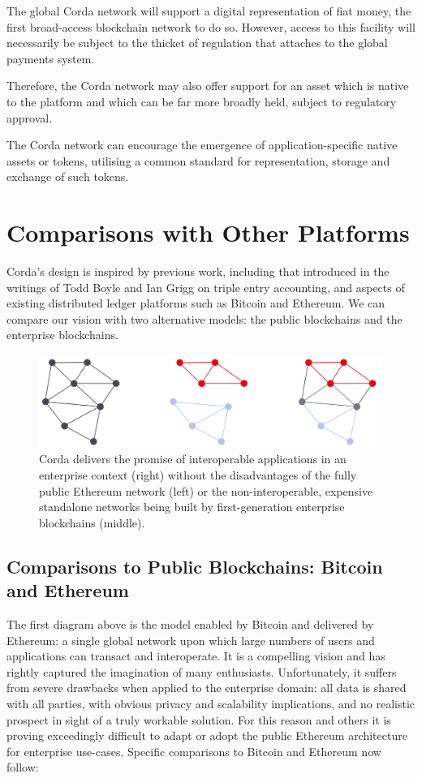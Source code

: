 \documentclass{article}
\begin{document}
The global Corda network will support a digital representation of fiat money, the first broad-access blockchain network to do so. However, access to this facility will necessarily be subject to the thicket of regulation that attaches to the global payments system.

Therefore, the Corda network may also offer support for an asset which is native to the platform and which can be far more broadly held, subject to regulatory approval.

The Corda network can encourage the emergence of application-specific native assets or tokens, utilising a common standard for representation, storage and exchange of such tokens.

\section{Comparisons with Other Platforms}
Corda's design is  inspired by previous work, including that introduced in the writings of Todd Boyle and Ian Grigg on triple entry accounting\cite{Triple}, and aspects of existing distributed ledger platforms such as Bitcoin\cite{Bitcoin} and Ethereum. We can compare our vision with two alternative models: the public blockchains and the enterprise blockchains.

\begin{figure}[H]
    \includegraphics[scale = .5, center]{platform-comparisons}
    \caption{Corda delivers the promise of interoperable applications in an enterprise context (right) without the disadvantages of the fully public Ethereum network (left) or the non-interoperable, expensive standalone networks being built by first-generation enterprise blockchains (middle).}
\end{figure}

\subsection{Comparisons to Public Blockchains: Bitcoin and Ethereum}

The first diagram above is the model enabled by Bitcoin and delivered by Ethereum: a single global network upon which large numbers of users and applications can transact and interoperate. It is a compelling vision and has rightly captured the imagination of many enthusiasts.  Unfortunately, it suffers from severe drawbacks when applied to the enterprise domain: all data is shared with all parties, with obvious privacy and scalability implications, and no realistic prospect in sight of a truly workable solution. For this reason and others it is proving exceedingly difficult to adapt or adopt the public Ethereum architecture for enterprise use-cases. Specific comparisons to Bitcoin and Ethereum now follow:
\end{document}
